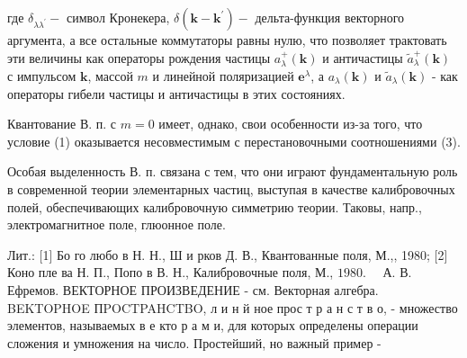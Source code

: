 \documentclass[10pt]{article}
\begin{document}
где $\delta_{\lambda \lambda^{\prime}}-$ символ Кронекера, $\delta\left(\boldsymbol{k}-\boldsymbol{k}^{\prime}\right)-$ дельта-функция векторного аргумента, а все остальные коммутаторы равны нулю, что позволяет трактовать эти величины как операторы рождения частицы $a_{\lambda}^{+}(\boldsymbol{k})$ и античастицы $\tilde{a}_{\lambda}^{+}(\boldsymbol{k})$ с импульсом $\boldsymbol{k}$, массой $m$ и линейной поляризацией $\boldsymbol{e}^{\lambda}$, а $a_{\lambda}(\boldsymbol{k})$ и $\widetilde{a}_{\lambda}(\boldsymbol{k})$ - как операторы гибели частицы и античастицы в этих состояниях.



Квантование В. п. с $m=0$ имеет, однако, свои особенности из-за того, что условие (1) оказывается несовместимым с перестановочными соотношениями (3).



Особая выделенность В. п. связана с тем, что они играют фундаментальную роль в современной теории элементарных частиц, выступая в качестве калибровочных полей, обеспечивающих калибровочную симметрию теории. Таковы, напр., электромагнитное поле, глюонное поле.



Лит.: [1] Бо го любо в Н. Н., Ш и рков Д. В., Квантованные поля, М.,, 1980; [2] Коно пле ва Н. П., Попо в В. Н., Калибровочные поля, М., $1980 . \quad$ А. В. Ефремов. ВЕКТОРНОЕ ПРОИЗВЕДЕНИЕ - см. Векторная алгебра. BEKTOPHOE ПPOCTPAHCTBO, л и н й ное прос т р а н с т в о, - множество элементов, называемых в е кто р а м и, для которых определены операции сложения и умножения на число. Простейший, но важный пример -
\end{document}
